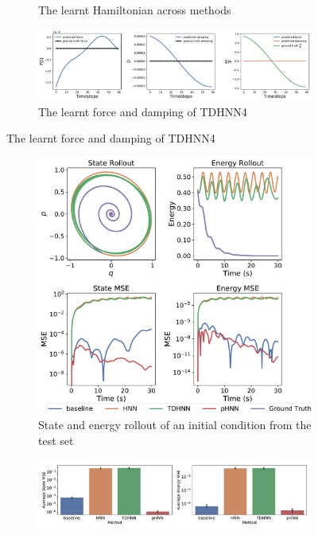 \documentclass[twoside]{article}
\begin{document}
\begin{figure}[!htb]
\begin{subfigure}[b]{0.48\textwidth}
\caption{The learnt Hamiltonian across methods}
\end{subfigure}
\begin{subfigure}[b]{0.48\textwidth}
\includegraphics[width=\textwidth]{figures/figures/mass_spring/1/mass_spring_dpdt_0.pdf}
\caption{The learnt force and damping of TDHNN4}
\end{subfigure}
\label{mspring_full}
\end{figure}
\begin{figure}[!htb]
\centering
\captionsetup{justification=centering}
\begin{subfigure}[b]{0.48\textwidth}
\includegraphics[width=\textwidth]{figures/figures/damped/1/damped_long_0.pdf}
\caption{State and energy rollout of an initial condition from the test set}
\end{subfigure}
\begin{subfigure}[b]{0.48\textwidth}
\includegraphics[width=\textwidth]{figures/figures/damped/1/damped_errors_0.pdf}

\end{subfigure}
\end{figure}
\end{document}
